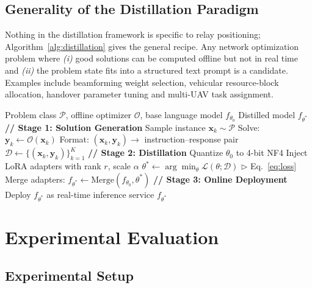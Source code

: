 \documentclass[journal]{IEEEtran}
\begin{document}
\subsection{Generality of the Distillation Paradigm}

Nothing in the distillation framework is specific to relay positioning; Algorithm~\ref{alg:distillation} gives the general recipe. Any network optimization problem where \emph{(i)} good solutions can be computed offline but not in real time and \emph{(ii)} the problem state fits into a structured text prompt is a candidate. Examples include beamforming weight selection, vehicular resource-block allocation, handover parameter tuning and multi-UAV task assignment.

\begin{algorithm}[!t]
\caption{Optimizer Distillation for Real-Time Network Optimization}
\label{alg:distillation}
\begin{algorithmic}[1]
\renewcommand{\algorithmicrequire}{\textbf{Input:}}
\renewcommand{\algorithmicensure}{\textbf{Output:}}
\REQUIRE Problem class $\mathcal{P}$, offline optimizer $\mathcal{O}$, base language model $f_{\theta_0}$
\ENSURE Distilled model $f_{\theta^*}$
\STATE \textbf{// Stage 1: Solution Generation}
    \STATE Sample instance $\mathbf{x}_k \sim \mathcal{P}$
    \STATE Solve: $\mathbf{y}_k \leftarrow \mathcal{O}(\mathbf{x}_k)$
    \STATE Format: $(\mathbf{x}_k, \mathbf{y}_k) \rightarrow$ instruction--response pair
\ENDFOR
\STATE $\mathcal{D} \leftarrow \{(\mathbf{x}_k, \mathbf{y}_k)\}_{k=1}^{K}$
\STATE \textbf{// Stage 2: Distillation}
\STATE Quantize $\theta_0$ to 4-bit NF4
\STATE Inject LoRA adapters with rank $r$, scale $\alpha$
\STATE $\theta^* \leftarrow \arg\min_\theta \mathcal{L}(\theta; \mathcal{D})$ \hfill $\triangleright$ Eq.~\eqref{eq:loss}
\STATE Merge adapters: $f_{\theta^*} \leftarrow \text{Merge}(f_{\theta_0}, \theta^*)$
\STATE \textbf{// Stage 3: Online Deployment}
\STATE Deploy $f_{\theta^*}$ as real-time inference service
\RETURN $f_{\theta^*}$
\end{algorithmic}
\end{algorithm}


\section{Experimental Evaluation}
\label{sec:results}

\subsection{Experimental Setup}
\end{document}
